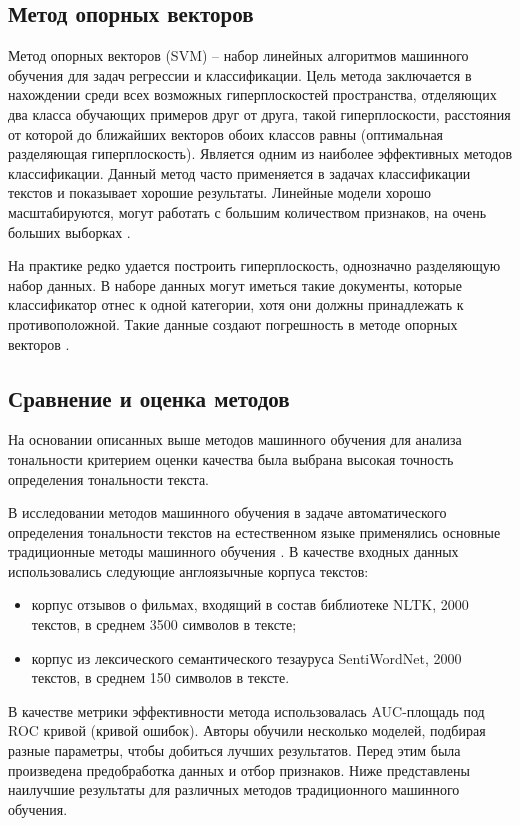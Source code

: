 \documentclass[a4paper,14pt, unknownkeysallowed]{extreport}
\begin{document}
	\subsection{Метод опорных векторов}
	
	Метод опорных векторов (SVM) -- набор линейных алгоритмов машинного обучения для задач регрессии и классификации. Цель метода заключается в нахождении среди всех возможных гиперплоскостей пространства, отделяющих два класса обучающих примеров друг от друга, такой гиперплоскости, расстояния от которой до ближайших векторов обоих классов равны (оптимальная разделяющая гиперплоскость). Является одним из наиболее эффективных методов классификации. Данный метод часто применяется в задачах классификации текстов и показывает хорошие результаты. Линейные модели хорошо масштабируются, могут работать с большим количеством признаков, на очень больших выборках \cite{Samigulin}. 
	
	На практике редко удается построить гиперплоскость, однозначно разделяющую набор данных. В наборе данных могут иметься такие документы, которые классификатор отнес к одной категории, хотя они должны принадлежать к противоположной. Такие данные создают погрешность в методе опорных векторов \cite{Noskov}.
	
	\subsection{Сравнение и оценка методов}

	На основании описанных выше методов машинного обучения для анализа тональности критерием оценки качества была выбрана высокая точность определения тональности текста.

	В исследовании методов машинного обучения в задаче автоматического определения тональности текстов на естественном языке применялись основные традиционные методы машинного обучения \cite{Samigulin}. В качестве входных данных использовались следующие англоязычные корпуса текстов:
	\begin{itemize}
		\item корпус отзывов о фильмах, входящий в состав библиотеке NLTK, 2000 текстов, в среднем 3500 символов в тексте;
		\item корпус из лексического семантического тезауруса SentiWordNet, 2000 текстов, в среднем 150 символов в тексте.
	\end{itemize}

	В качестве метрики эффективности метода использовалась AUC-площадь под ROC кривой (кривой ошибок). Авторы обучили несколько моделей, подбирая разные параметры, чтобы добиться лучших результатов. Перед этим была произведена предобработка данных и отбор признаков. Ниже представлены наилучшие результаты для различных методов традиционного машинного обучения.
\end{document}
